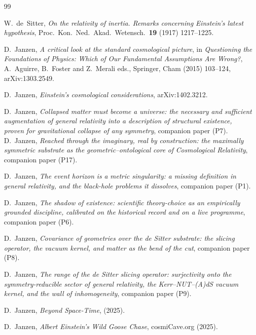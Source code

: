 \documentclass[11pt,a4paper]{article}
\begin{document}
\begin{thebibliography}{99}

 W.~de~Sitter, \emph{On the relativity of inertia. Remarks concerning Einstein's latest hypothesis}, Proc.\ Kon.\ Ned.\ Akad.\ Wetensch.\ \textbf{19} (1917) 1217--1225.

 D.~Janzen, \emph{A critical look at the standard cosmological picture}, in \emph{Questioning the Foundations of Physics: Which of Our Fundamental Assumptions Are Wrong?}, A.~Aguirre, B.~Foster and Z.~Merali eds., Springer, Cham (2015) 103--124, arXiv:1303.2549.

 D.~Janzen, \emph{Einstein's cosmological considerations}, arXiv:1402.3212.

 D.~Janzen, \emph{Collapsed matter must become a universe: the necessary and sufficient augmentation of general relativity into a description of structural existence, proven for gravitational collapse of any symmetry}, companion paper (P7).
 D.~Janzen, \emph{Reached through the imaginary, real by construction: the maximally symmetric substrate as the geometric--ontological core of Cosmological Relativity}, companion paper (P17).

D.~Janzen,
\emph{The event horizon is a metric singularity: a missing definition in general relativity, and the black-hole problems it dissolves}, companion paper (P1).

D.~Janzen,
\emph{The shadow of existence: scientific theory-choice as an empirically grounded discipline, calibrated on the historical record and on a live programme}, companion paper (P6).

D.~Janzen,
\emph{Covariance of geometries over the de Sitter substrate: the slicing operator, the vacuum kernel, and matter as the bend of the cut}, companion paper (P8).

D.~Janzen,
\emph{The range of the de Sitter slicing operator: surjectivity onto the symmetry-reducible sector of general relativity, the Kerr--NUT--(A)dS vacuum kernel, and the wall of inhomogeneity}, companion paper (P9).

D.~Janzen,
\emph{Beyond Space-Time},
(2025).

D.~Janzen,
\emph{Albert Einstein's Wild Goose Chase},
cosmiCave.org (2025).


\end{thebibliography}
\end{document}
